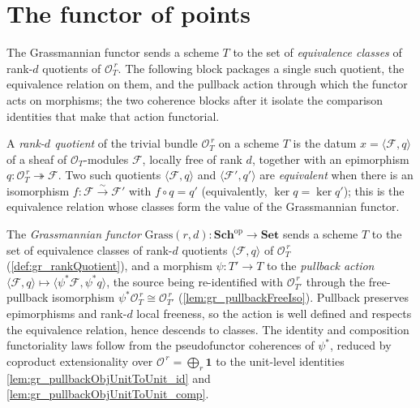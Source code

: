 \section{The functor of points}
\label{sec:grquot_functor}

The Grassmannian functor sends a scheme \(T\) to the set of \emph{equivalence classes} of
rank-\(d\) quotients of \(\mathcal{O}_T^{\,r}\). The following block packages a single such
quotient, the equivalence relation on them, and the pullback action through which the
functor acts on morphisms; the two coherence blocks after it isolate the comparison
identities that make that action functorial.

\begin{definition}
  \label{def:gr_rankQuotient}
  A \emph{rank-\(d\) quotient} of the trivial bundle \(\mathcal{O}_T^{\,r}\) on a scheme
  \(T\) is the datum \(x = \langle \mathcal{F}, q\rangle\) of a sheaf of
  \(\mathcal{O}_T\)-modules \(\mathcal{F}\), locally free of rank \(d\), together with an
  epimorphism \(q : \mathcal{O}_T^{\,r} \twoheadrightarrow \mathcal{F}\). Two such quotients
  \(\langle \mathcal{F}, q\rangle\) and \(\langle \mathcal{F}', q'\rangle\) are
  \emph{equivalent} when there is an isomorphism \(f : \mathcal{F} \xrightarrow{\sim}
  \mathcal{F}'\) with \(f \circ q = q'\) (equivalently, \(\ker q = \ker q'\)); this is the
  equivalence relation whose classes form the value of the Grassmannian functor.
\end{definition}

\begin{definition}
  \label{def:grassmannian_functor}
  The \emph{Grassmannian functor} \(\mathrm{Grass}(r,d) : \mathbf{Sch}^{\mathrm{op}} \to
  \mathbf{Set}\) sends a scheme \(T\) to the set of equivalence classes of rank-\(d\)
  quotients \(\langle \mathcal{F}, q\rangle\) of \(\mathcal{O}_T^{\,r}\)
  (\cref{def:gr_rankQuotient}), and a morphism \(\psi : T' \to T\) to the \emph{pullback
  action} \(\langle \mathcal{F}, q\rangle \mapsto \langle \psi^{*}\mathcal{F}, \psi^{*}q\rangle\),
  the source being re-identified with \(\mathcal{O}_{T'}^{\,r}\) through the free-pullback
  isomorphism \(\psi^{*}\mathcal{O}_T^{\,r} \cong \mathcal{O}_{T'}^{\,r}\)
  (\cref{lem:gr_pullbackFreeIso}). Pullback preserves epimorphisms and rank-\(d\) local
  freeness, so the action is well defined and respects the equivalence relation, hence
  descends to classes. The identity and composition functoriality laws follow from the
  pseudofunctor coherences of \(\psi^{*}\), reduced by coproduct extensionality over
  \(\mathcal{O}^{\,r} = \bigoplus_r \mathbf{1}\) to the unit-level identities
  \cref{lem:gr_pullbackObjUnitToUnit_id} and \cref{lem:gr_pullbackObjUnitToUnit_comp}.
\end{definition}



